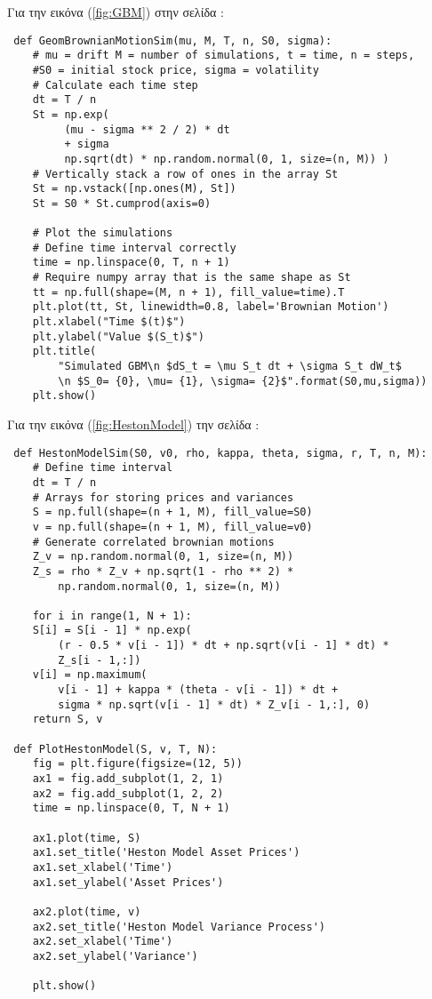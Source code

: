 \documentclass[12pt,a4paper,twoside,openany]{book}
\begin{document}
 	\vspace{4mm}
 	Για την εικόνα (\ref{fig:GBM}) στην σελίδα \pageref{fig:GBM}:
 	\vspace{4mm}
\begin{lstlisting}
 def GeomBrownianMotionSim(mu, M, T, n, S0, sigma):
 	# mu = drift M = number of simulations, t = time, n = steps, 
 	#S0 = initial stock price, sigma = volatility
 	# Calculate each time step
 	dt = T / n
 	St = np.exp(
 		 (mu - sigma ** 2 / 2) * dt
 		 + sigma 
 		 np.sqrt(dt) * np.random.normal(0, 1, size=(n, M)) )
 	# Vertically stack a row of ones in the array St
 	St = np.vstack([np.ones(M), St])  
 	St = S0 * St.cumprod(axis=0)
 		
 	# Plot the simulations
 	# Define time interval correctly
 	time = np.linspace(0, T, n + 1)
 	# Require numpy array that is the same shape as St
 	tt = np.full(shape=(M, n + 1), fill_value=time).T
 	plt.plot(tt, St, linewidth=0.8, label='Brownian Motion')
 	plt.xlabel("Time $(t)$")
 	plt.ylabel("Value $(S_t)$")
 	plt.title(
 		"Simulated GBM\n $dS_t = \mu S_t dt + \sigma S_t dW_t$
 		\n $S_0= {0}, \mu= {1}, \sigma= {2}$".format(S0,mu,sigma))
 	plt.show()\end{lstlisting}
 	\vspace{4mm}
 	Για την εικόνα (\ref{fig:HestonModel}) την σελίδα \pageref{fig:HestonModel}:
 	\vspace{4mm} 	
\begin{lstlisting}
 def HestonModelSim(S0, v0, rho, kappa, theta, sigma, r, T, n, M):
 	# Define time interval
	dt = T / n
	# Arrays for storing prices and variances
	S = np.full(shape=(n + 1, M), fill_value=S0)
	v = np.full(shape=(n + 1, M), fill_value=v0)
	# Generate correlated brownian motions
	Z_v = np.random.normal(0, 1, size=(n, M))
	Z_s = rho * Z_v + np.sqrt(1 - rho ** 2) * 
		np.random.normal(0, 1, size=(n, M))
	
	for i in range(1, N + 1):
	S[i] = S[i - 1] * np.exp(
		(r - 0.5 * v[i - 1]) * dt + np.sqrt(v[i - 1] * dt) * 
		Z_s[i - 1,:])
	v[i] = np.maximum(
		v[i - 1] + kappa * (theta - v[i - 1]) * dt + 
		sigma * np.sqrt(v[i - 1] * dt) * Z_v[i - 1,:], 0)
	return S, v 

 def PlotHestonModel(S, v, T, N):
	fig = plt.figure(figsize=(12, 5))
	ax1 = fig.add_subplot(1, 2, 1)
	ax2 = fig.add_subplot(1, 2, 2)
	time = np.linspace(0, T, N + 1)
	
	ax1.plot(time, S)
	ax1.set_title('Heston Model Asset Prices')
	ax1.set_xlabel('Time')
	ax1.set_ylabel('Asset Prices')
	
	ax2.plot(time, v)
	ax2.set_title('Heston Model Variance Process')
	ax2.set_xlabel('Time')
	ax2.set_ylabel('Variance')
	
	plt.show()\end{lstlisting}
\end{document}
